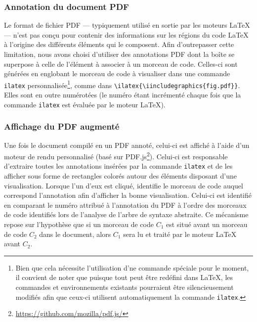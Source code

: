 \subsubsection{Annotation du document PDF}
Le format de fichier PDF --- typiquement utilisé en sortie par les moteurs \LaTeX{} --- n'est pas conçu pour contenir des informations sur les régions du code \LaTeX{} à l'origine des différents éléments qui le composent.
Afin d'outrepasser cette limitation, nous avons choisi d'utiliser des annotations PDF dont la boîte se superpose à celle de l'élément à associer à un morceau de code.
Celles-ci sont générées en englobant le morceau de code à visualiser dans une commande \texttt{ilatex} personnalisée\footnote{Bien que cela nécessite l'utilisation d'ne commande spéciale pour le moment, il convient de noter que puisque tout peut être redéfini dans \LaTeX{}, les commandes et environnements existants pourraient être silencieusement modifiés afin que ceux-ci utilisent automatiquement la commande \texttt{ilatex}.}, comme dans \verb|\ilatex{\iincludegraphics{fig.pdf}}|.
Elles sont en outre numérotées (le numéro étant incrémenté chaque fois que la commande \texttt{ilatex} est évaluée par le moteur \LaTeX{}).


\subsubsection{Affichage du PDF augmenté}
Une fois le document compilé en un PDF annoté, celui-ci est affiché à l'aide d'un moteur de rendu personnalisé (basé sur PDF.js\footnote{\url{https://github.com/mozilla/pdf.js/}}).
Celui-ci est responsable d'extraire toutes les annotations insérées par la commande \texttt{ilatex} et de les afficher sous forme de rectangles colorés autour des éléments disposant d'une visualisation.
Lorsque l'un d'eux est cliqué, \iLaTeX{} identifie le morceau de code auquel correspond l'annotation afin d'afficher la bonne visualisation.
Celui-ci est identifié en comparant le numéro attribué à l'annotation du PDF à l'ordre des morceaux de code identifiés lors de l'analyse de l'arbre de syntaxe abstraite.
Ce mécanisme repose sur l'hypothèse que si un morceau de code $C_1$ est situé avant un morceau de code $C_2$ dans le document, alors $C_1$ sera lu et traité par le moteur \LaTeX{} avant $C_2$.



